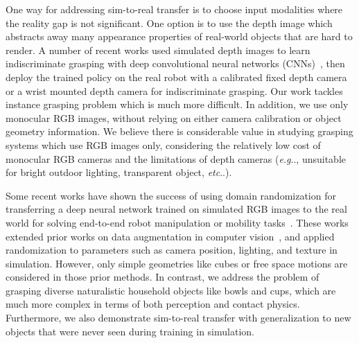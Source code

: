 \documentclass[letterpaper, 10 pt, conference]{ieeeconf}  %
\makeatletter
\DeclareRobustCommand\onedot{\futurelet\@let@token\@onedot}
\def\@onedot{\ifx\@let@token.\else.\null\fi\xspace}
\def\eg{\emph{e.g}\onedot} \def\Eg{\emph{E.g}\onedot}
\def\etc{\emph{etc}\onedot} \def\vs{\emph{vs}\onedot}
\makeatother
\begin{document}
One way for addressing sim-to-real transfer is to choose input modalities where the reality gap is not significant. One option is to use the depth image which abstracts away many appearance properties of real-world objects that are hard to render. A number of recent works used simulated depth images to learn indiscriminate grasping with deep convolutional neural networks (CNNs)~\cite{mahler2017dex,viereck2017learning}, then deploy the trained policy on the real robot with a calibrated fixed depth camera or a wrist mounted depth camera for indiscriminate grasping. Our work tackles instance grasping problem which is much more difficult. In addition, we use only monocular RGB images, without relying on either camera calibration or object geometry information. We believe there is considerable value in studying grasping systems which use RGB images only, considering the relatively low cost of monocular RGB cameras and the limitations of depth cameras (\eg, unsuitable for bright outdoor lighting, transparent object, \etc).

Some recent works have shown the success of using domain randomization for transferring a deep neural network trained on simulated RGB images to the real world for solving end-to-end robot manipulation or mobility tasks~\cite{sadeghi2016cad2rl,tobin2017domain,james2017transferring}. These works extended prior works on data augmentation in computer vision~\cite{simard2003best}, and applied randomization to parameters such as camera position, lighting, and texture in simulation. However, only simple geometries like cubes or free space motions are considered in those prior methods. In contrast, we address the problem of grasping diverse naturalistic household objects like bowls and cups, which are much more complex in terms of both perception and contact physics. Furthermore, we also demonstrate sim-to-real transfer with generalization to new objects that were never seen during training in simulation.
\end{document}
